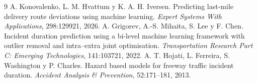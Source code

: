 \documentclass[11pt,a4paper]{article}
\begin{document}
\begin{thebibliography}{9}
   A. Konovalenko, L. M. Hvattum y K. A. H. Iversen. Predicting last-mile
  delivery route deviations using machine learning. \emph{Expert Systems With Applications},
  298:129921, 2026.
   A. Grigorev, A.-S. Mihaita, S. Lee y F. Chen. Incident duration prediction using
  a bi-level machine learning framework with outlier removal and intra--extra joint optimisation.
  \emph{Transportation Research Part C: Emerging Technologies}, 141:103721, 2022.
   A. T. Hojati, L. Ferreira, S. Washington y P. Charles. Hazard based models for
  freeway traffic incident duration. \emph{Accident Analysis \& Prevention}, 52:171--181, 2013.
\end{thebibliography}
\end{document}
